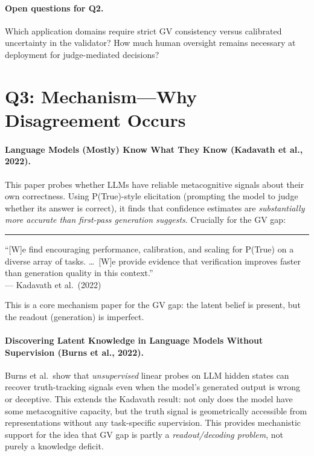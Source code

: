 \documentclass[11pt]{article}
\newenvironment{paperquote}{%
  \vspace{0.5em}%
  \begin{list}{}{%
    \setlength{\leftmargin}{1.5em}%
    \setlength{\rightmargin}{0em}%
    \setlength{\topsep}{0.2em}%
    \setlength{\parsep}{0pt}%
  }%
  \item\relax\small\itshape\leavevmode%
  \hspace{-1.3em}\textcolor{gray!80}{\rule{2pt}{1em}}\hspace{0.5em}%
}{%
  \end{list}%
  \vspace{0.3em}%
}
\begin{document}
\paragraph{Open questions for Q2.}
Which application domains require strict GV consistency versus calibrated uncertainty in the validator? How much human oversight remains necessary at deployment for judge-mediated decisions?

\section{Q3: Mechanism---Why Disagreement Occurs}

\paragraph{Language Models (Mostly) Know What They Know (Kadavath et al., 2022).}
This paper probes whether LLMs have reliable metacognitive signals about their own correctness. Using P(True)-style elicitation (prompting the model to judge whether its answer is correct), it finds that confidence estimates are \emph{substantially more accurate than first-pass generation suggests}. Crucially for the GV gap:

\begin{paperquote}
\small ``[W]e find encouraging performance, calibration, and scaling for P(True) on a diverse array of tasks. \ldots\ [W]e provide evidence that verification improves faster than generation quality in this context.''\\
\hfill --- Kadavath et al.\ (2022)
\end{paperquote}

This is a core mechanism paper for the GV gap: the latent belief is present, but the readout (generation) is imperfect.

\paragraph{Discovering Latent Knowledge in Language Models Without Supervision (Burns et al., 2022).}
Burns et al.\ show that \emph{unsupervised} linear probes on LLM hidden states can recover truth-tracking signals even when the model's generated output is wrong or deceptive. This extends the Kadavath result: not only does the model have some metacognitive capacity, but the truth signal is geometrically accessible from representations without any task-specific supervision. This provides mechanistic support for the idea that GV gap is partly a \emph{readout/decoding problem}, not purely a knowledge deficit.
\end{document}
